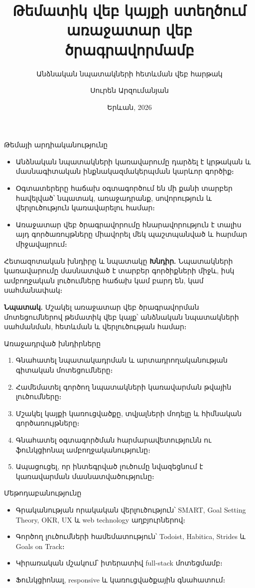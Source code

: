 \documentclass[12pt,aspectratio=169]{beamer}
\title{Թեմատիկ վեբ կայքի ստեղծում առաջատար վեբ ծրագրավորմամբ}
\subtitle{Անձնական նպատակների հետևման վեբ հարթակ}
\author{Սուրեն Արզումանյան}
\institute{Եվրասիա միջազգային համալսարան\\Կառավարման և տեղեկատվական տեխնոլոգիաների ամբիոն}
\date{Երևան, 2026}
\begin{document}
\begin{frame}
  \titlepage
\end{frame}

\begin{frame}{Թեմայի արդիականությունը}
  \begin{itemize}
    \item Անձնական նպատակների կառավարումը դարձել է կրթական և մասնագիտական ինքնակազմակերպման կարևոր գործիք։
    \item Օգտատերերը հաճախ օգտագործում են մի քանի տարբեր հավելված՝ նպատակ, առաջադրանք, սովորություն և վերլուծություն կառավարելու համար։
    \item Առաջատար վեբ ծրագրավորումը հնարավորություն է տալիս այդ գործառույթները միավորել մեկ պաշտպանված և հարմար միջավայրում։
  \end{itemize}
\end{frame}

\begin{frame}{Հետազոտական խնդիրը և նպատակը}
  \textbf{Խնդիր.} Նպատակների կառավարումը մասնատված է տարբեր գործիքների միջև, իսկ ամբողջական լուծումները հաճախ կամ բարդ են, կամ սահմանափակ։

  \vspace{0.5cm}
  \textbf{Նպատակ.} Մշակել առաջատար վեբ ծրագրավորման մոտեցումներով թեմատիկ վեբ կայք՝ անձնական նպատակների սահմանման, հետևման և վերլուծության համար։
\end{frame}

\begin{frame}{Առաջադրված խնդիրները}
  \begin{enumerate}
    \item Գնահատել նպատակադրման և արտադրողականության գիտական մոտեցումները։
    \item Համեմատել գործող նպատակների կառավարման թվային լուծումները։
    \item Մշակել կայքի կառուցվածքը, տվյալների մոդելը և հիմնական գործառույթները։
    \item Գնահատել օգտագործման հարմարավետությունն ու ֆունկցիոնալ ամբողջականությունը։
    \item Ապացուցել, որ ինտեգրված լուծումը նվազեցնում է կառավարման մասնատվածությունը։
  \end{enumerate}
\end{frame}

\begin{frame}{Մեթոդաբանությունը}
  \begin{itemize}
    \item Գրականության որակական վերլուծություն՝ SMART, Goal Setting Theory, OKR, UX և web technology աղբյուրներով։
    \item Գործող լուծումների համեմատություն՝ Todoist, Habitica, Strides և Goals on Track։
    \item Կիրառական մշակում՝ իտերատիվ full-stack մոտեցմամբ։
    \item Ֆունկցիոնալ, responsive և կառուցվածքային գնահատում։
  \end{itemize}
\end{frame}
\end{document}
